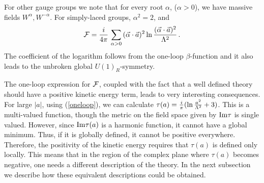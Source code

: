 For other gauge groups we note that for every root $\alpha$, ($\alpha
> 0$), we have massive fields $W^{\alpha}, W^{- \alpha}$. For
simply-laced groups, $\alpha^{2} = 2$, and
$$
{\cal F} = \frac{i}{4\pi} \, \sum_{\alpha > 0} \, (\vec{\alpha} \cdot
\vec{a})^{2} \, {\rm ln}\, \frac{(\vec{\alpha}\cdot
\vec{a})^{2}}{\Lambda^{2}}\,.
$$
The coefficient of the logarithm follows from the one-loop
$\beta$-function and it also leads to the unbroken global
$U(1)_{R}$-symmetry.

The one-loop expression for ${\cal F}$, coupled with the fact that a
well defined theory should have a positive kinetic energy term, leads
to very interesting consequences.  For large $|a|$, using
(\ref{oneloop}), we can calculate $\tau(a)=\frac{i}{\pi}({\rm
ln}\,\frac{a^2}{\Lambda^2}+ 3)$. This is a multi-valued function,
though the metric on the field space given by ${\rm Im}\tau$ is single
valued. However, since ${\rm Im}\tau(a)$ is a harmonic function, it
cannot have a global minimum. Thus, if it is globally defined, it
cannot be positive everywhere. Therefore, the positivity of the
kinetic energy requires that $\tau(a)$ is defined only locally. This
means that in the region of the complex plane where $\tau(a)$ becomes
negative, one needs a different description of the theory. In the next
subsection we describe how these equivalent descriptions could be
obtained.

